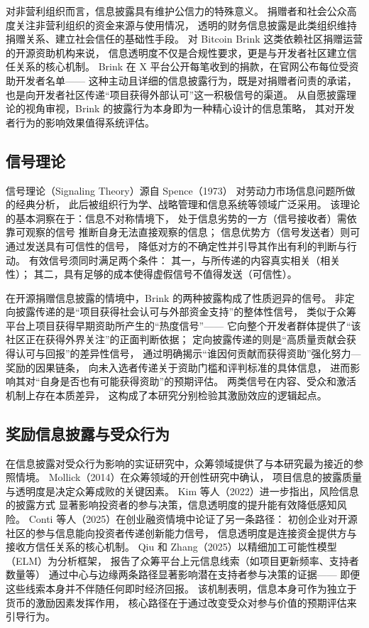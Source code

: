 \documentclass[
    type = master, %
    degree = professional,        %
    decl-page,  %
    twoside,                %
    fontset = fandol %
  ]{njuthesis}
\begin{document}
对非营利组织而言，信息披露具有维护公信力的特殊意义。
捐赠者和社会公众高度关注非营利组织的资金来源与使用情况，
透明的财务信息披露是此类组织维持捐赠关系、建立社会信任的基础性手段\cite{liu2015nonprofit}。
对 Bitcoin Brink 这类依赖社区捐赠运营的开源资助机构来说，
信息透明度不仅是合规性要求，更是与开发者社区建立信任关系的核心机制。
Brink 在 X 平台公开每笔收到的捐款，在官网公布每位受资助开发者名单——
这种主动且详细的信息披露行为，既是对捐赠者问责的承诺，
也是向开发者社区传递“项目获得外部认可”这一积极信号的渠道。
从自愿披露理论的视角审视，Brink 的披露行为本身即为一种精心设计的信息策略，
其对开发者行为的影响效果值得系统评估。

\subsection{信号理论}

信号理论（Signaling Theory）源自 Spence（1973）
对劳动力市场信息问题所做的经典分析\cite{spence1973job}，
此后被组织行为学、战略管理和信息系统等领域广泛采用。
该理论的基本洞察在于：信息不对称情境下，
处于信息劣势的一方（信号接收者）需依靠可观察的信号
推断自身无法直接观察的信息；
信息优势方（信号发送者）则可通过发送具有可信性的信号，
降低对方的不确定性并引导其作出有利的判断与行动。
有效信号须同时满足两个条件：
其一，与所传递的内容真实相关（相关性）；
其二，具有足够的成本使得虚假信号不值得发送（可信性）\cite{connelly2011signaling}。

在开源捐赠信息披露的情境中，Brink 的两种披露构成了性质迥异的信号。
非定向披露传递的是“项目获得社会认可与外部资金支持”的整体性信号，
类似于众筹平台上项目获得早期资助所产生的“热度信号”——
它向整个开发者群体提供了“该社区正在获得外界关注”的正面判断依据；
定向披露传递的则是“高质量贡献会获得认可与回报”的差异性信号，
通过明确揭示“谁因何贡献而获得资助”强化努力—奖励的因果链条，
向未入选者传递关于资助门槛和评判标准的具体信息，
进而影响其对“自身是否也有可能获得资助”的预期评估。
两类信号在内容、受众和激活机制上存在本质差异，
这构成了本研究分别检验其激励效应的逻辑起点。

\subsection{奖励信息披露与受众行为}

在信息披露对受众行为影响的实证研究中，众筹领域提供了与本研究最为接近的参照情境。
Mollick（2014）在众筹领域的开创性研究中确认，
项目信息的披露质量与透明度是决定众筹成败的关键因素\cite{mollick2014dynamics}。
Kim 等人（2022）进一步指出，风险信息的披露方式
显著影响投资者的参与决策，信息透明度的提升能有效降低感知风险\cite{kim2022risk}。
Conti 等人（2025）在创业融资情境中论证了另一条路径：
初创企业对开源社区的参与信息能向投资者传递创新能力信号，
信息透明度是连接资金提供方与接收方信任关系的核心机制\cite{conti2025beefing}。
Qiu 和 Zhang（2025）以精细加工可能性模型（ELM）为分析框架，
报告了众筹平台上元信息线索（如项目更新频率、支持者数量等）
通过中心与边缘两条路径显著影响潜在支持者参与决策的证据——
即便这些线索本身并不伴随任何即时经济回报\cite{qiu2025crowdfunding}。
该机制表明，信息本身可作为独立于货币的激励因素发挥作用，
核心路径在于通过改变受众对参与价值的预期评估来引导行为。
\end{document}
